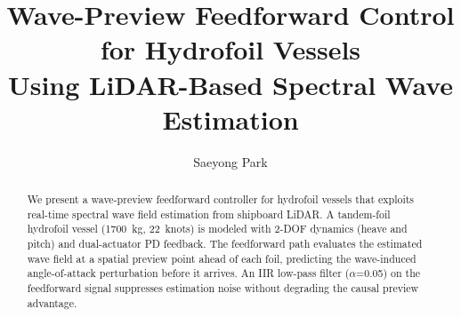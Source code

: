 \documentclass[review]{elsarticle}
\begin{document}
\begin{frontmatter}

\title{Wave-Preview Feedforward Control for Hydrofoil Vessels\\Using LiDAR-Based Spectral Wave Estimation}

\author[avikus]{Saeyong Park}
\address[avikus]{Avikus (HD Hyundai), Republic of Korea}

\begin{abstract}
We present a wave-preview feedforward controller for hydrofoil vessels
that exploits real-time spectral wave field estimation from shipboard LiDAR.
A tandem-foil hydrofoil vessel (1700~kg, 22~knots) is modeled
with 2-DOF dynamics (heave and pitch) and dual-actuator PD feedback.
The feedforward path evaluates the estimated wave field at a spatial preview
point ahead of each foil, predicting the wave-induced angle-of-attack
perturbation before it arrives.
An IIR low-pass filter ($\alpha$=0.05) on the feedforward signal suppresses
estimation noise without degrading the causal preview advantage.


\end{abstract}
\end{frontmatter}
\end{document}
